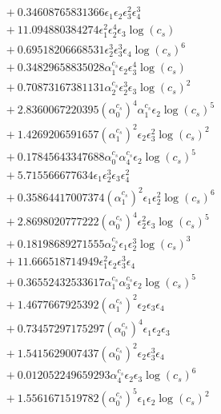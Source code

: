 \documentclass[10pt]{article}
\begin{document}
\begin{align*}
&{}  + 0.34608765831366 \epsilon_{1} \epsilon_{2} \epsilon_{3}^{2} \epsilon_{4}^{3} \\
&{}  + 11.094880384274 \epsilon_{1}^{2} \epsilon_{2}^{4} \epsilon_{3} \log{\left(c_{s} \right)} \\
&{}  + 0.69518206668531 \epsilon_{2}^{3} \epsilon_{3}^{3} \epsilon_{4} \log{\left(c_{s} \right)}^{6} \\
&{}  + 0.34829658835028 \alpha_{1}^{c_s} \epsilon_{2} \epsilon_{3}^{4} \log{\left(c_{s} \right)} \\
&{}  + 0.70873167381131 \alpha_{2}^{c_s} \epsilon_{2}^{3} \epsilon_{3} \log{\left(c_{s} \right)}^{2} \\
&{}  + 2.8360067220395 \left(\alpha_{0}^{c_s}\right)^{4} \alpha_{1}^{c_s} \epsilon_{2} \log{\left(c_{s} \right)}^{5} \\
&{}  + 1.4269206591657 \left(\alpha_{1}^{c_s}\right)^{2} \epsilon_{2} \epsilon_{3}^{2} \log{\left(c_{s} \right)}^{2} \\
&{}  + 0.17845643347688 \alpha_{0}^{c_s} \alpha_{4}^{c_s} \epsilon_{2} \log{\left(c_{s} \right)}^{5} \\
&{}  + 5.715566677634 \epsilon_{1} \epsilon_{2}^{3} \epsilon_{3} \epsilon_{4}^{2} \\
&{}  + 0.35864417007374 \left(\alpha_{1}^{c_s}\right)^{2} \epsilon_{1} \epsilon_{2}^{2} \log{\left(c_{s} \right)}^{6} \\
&{}  + 2.8698020777222 \left(\alpha_{0}^{c_s}\right)^{4} \epsilon_{2}^{2} \epsilon_{3} \log{\left(c_{s} \right)}^{5} \\
&{}  + 0.18198689271555 \alpha_{2}^{c_s} \epsilon_{1} \epsilon_{2}^{3} \log{\left(c_{s} \right)}^{3} \\
&{}  + 11.666518714949 \epsilon_{1}^{2} \epsilon_{2} \epsilon_{3}^{3} \epsilon_{4} \\
&{}  + 0.36552432533617 \alpha_{1}^{c_s} \alpha_{3}^{c_s} \epsilon_{2} \log{\left(c_{s} \right)}^{5} \\
&{}  + 1.4677667925392 \left(\alpha_{1}^{c_s}\right)^{2} \epsilon_{2} \epsilon_{3} \epsilon_{4} \\
&{}  + 0.73457297175297 \left(\alpha_{0}^{c_s}\right)^{4} \epsilon_{1} \epsilon_{2} \epsilon_{3} \\
&{}  + 1.5415629007437 \left(\alpha_{0}^{c_s}\right)^{2} \epsilon_{2} \epsilon_{3}^{3} \epsilon_{4} \\
&{}  + 0.012052249659293 \alpha_{4}^{c_s} \epsilon_{2} \epsilon_{3} \log{\left(c_{s} \right)}^{6} \\
&{}  + 1.5561671519782 \left(\alpha_{0}^{c_s}\right)^{5} \epsilon_{1} \epsilon_{2} \log{\left(c_{s} \right)}^{2} \\

\end{align*}
\end{document}
